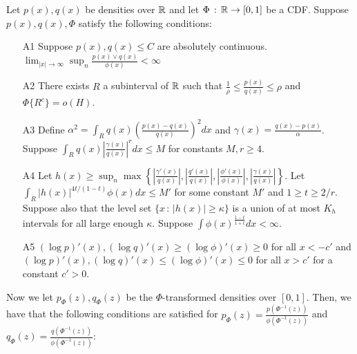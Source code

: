 \documentclass{article}
\begin{document}
\begin{proposition}
\label{prop:transformation1}
Let $p(x), q(x)$ be densities over ${\mathbb R}$ and let $\Phi \,:\, {\mathbb R} \rightarrow [0,1]$ be a CDF. Suppose $p(x), q(x), \Phi$ satisfy the following conditions:

\begin{enumerate}
\item[A1] Suppose $p(x), q(x) \leq C$ are absolutely continuous.  $\lim_{|x| \rightarrow \infty} \sup_n \frac{p(x) \vee q(x)}{\phi(x)} < \infty$
\item[A2] There exists $R$ a subinterval of ${\mathbb R}$ such that $\frac{1}{\rho} \leq \frac{p(x)}{q(x)} \leq \rho $ and $\Phi\{R^c\} = o(H)$.

\item[A3] Define $\alpha^2 = \int_R q(x) \left( \frac{p(x) - q(x)}{q(x)} \right)^2 dx$ and $\gamma(x) = \frac{q(x) - p(x)}{\alpha}$. Suppose $\int_R q(x) \left| \frac{\gamma(x)}{q(x)} \right|^r dx  \leq M$ for constants $M, r \geq 4$.

\item[A4] {Let $h(x) \geq \sup_n \max \left\{  \left|\frac{\gamma'(x)}{q(x)} \right|, 
 \left|\frac{q'(x)}{q(x)}\right|, \left| \frac{\phi'(x)}{\phi(x)}\right|, \left | \frac{\gamma(x)}{q(x)} \right|  \right\} $. Let $\int_R |h(x)|^{4t/(1-t)} \phi(x) dx \leq M'$ for some constant $M'$ and $1 \geq t \geq 2/r$. Suppose also that the level set $\{x \,:\, |h(x)| \geq \kappa\}$ is a union of at most $K_h$ intervals for all large enough $\kappa$. Suppose $\int \phi(x)^{\frac{1-t}{1+t}} dx < \infty$.}
 
\item[A5]  $(\log p)'(x), (\log q)'(x) \geq (\log \phi)'(x) \geq 0$ for all $x < -c'$ and $ (\log p)'(x), (\log q)'(x) \leq (\log \phi)'(x) \leq 0$ for all $x > c'$ for a constant $c' > 0$.
\end{enumerate}

Now we let $p_\Phi(z), q_\Phi(z)$ be the $\Phi$-transformed densities over $[0,1]$.
Then, we have that the following conditions are satisfied for $p_\Phi(z) = \frac{p(\Phi^{-1}(z))}{\phi(\Phi^{-1}(z))}$ and $q_\Phi(z) = \frac{q(\Phi^{-1}(z))}{\phi(\Phi^{-1}(z))}$:


\end{proposition}
\end{document}
